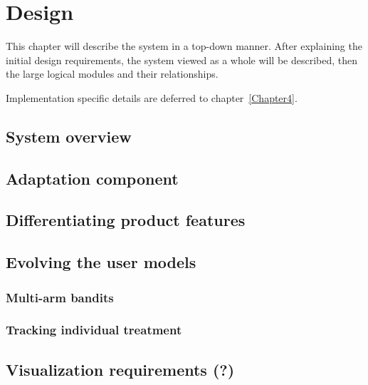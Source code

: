 \chapter{Design}

\label{Chapter3}


% 


This chapter will describe the system in a top-down manner. After explaining the initial design requirements, the system viewed as a whole will be described, then the large logical modules and their relationships.

Implementation specific details are deferred to chapter~\ref{Chapter4}.

\section{System overview} %
\label{sec:system_overview}


\section{Adaptation component} %
\label{sec:adaptation_component}


\section{Differentiating product features} %
\label{sec:differentiating_product_features}


\section{Evolving the user models} %
\label{sec:evolving_the_user_models}

\subsection{Multi-arm bandits}

\subsection{Tracking individual treatment}


\section{Visualization requirements (?)} %
\label{sec:visualization_requirements}

